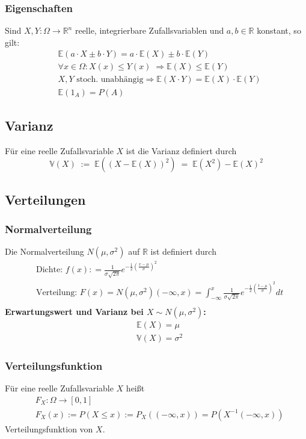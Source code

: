 \documentclass[a4paper]{article}
\begin{document}
\subsubsection{Eigenschaften}
Sind $X,Y : \Omega \to \mathbb{R}^n$   reelle, integrierbare  Zufallsvariablen und $a,b \in \mathbb{R}$ konstant, so gilt:
\begin{align*}
& \mathbb{E}(a \cdot X \pm b \cdot Y) = a \cdot \mathbb{E}(X) \pm b \cdot \mathbb{E}(Y) \\
& \forall x \in \Omega: X(x) \leq Y(x) \;   \Rightarrow \mathbb{E}(X) \leq \mathbb{E}(Y) \\
& X ,Y \text{ stoch. unabhängig} \Rightarrow   \mathbb{E}(X \cdot Y) =  \mathbb{E}(X) \cdot  \mathbb{E}(Y) \\
& \mathbb{E} (1_A) = P (A)
\end{align*}

\subsection{Varianz}
Für eine reelle Zufallsvariable $X$ ist die Varianz definiert durch
$$ \mathbb{V} (X) \; := \;  \mathbb{E}( (X - \mathbb{E}(X))^2) \;  = \; \mathbb{E}(X^2) -  \mathbb{E}(X)^2$$


\subsection{Verteilungen}

\subsubsection{Normalverteilung}
Die Normalverteilung $N{(\mu,\sigma^2)}$ auf $\mathbb{R}$ ist definiert durch
\begin{align*}
& \text{Dichte: } f (x) : = \frac 1{\sigma \sqrt{2\pi}}e^{- \frac {1}{2} (\frac{x- \mu}{ \sigma})^2} \\
&  \text{Verteilung: } F(x) = N{(\mu,\sigma^2)}(-\infty , x) =  \int_{-\infty}^{x}  \frac 1{\sigma \sqrt{2\pi}}e^{- \frac {1}{2} (\frac{t- \mu}{ \sigma})^2}dt\\
\end{align*}
\textbf{Erwartungswert und Varianz bei $X \sim N(\mu, \sigma^2)$:}
\begin{align*}
& \mathbb{E}(X) = \mu \\
& \mathbb{V}(X) = \sigma^2
\end{align*}

\subsubsection{Verteilungsfunktion}
Für eine reelle Zufallsvariable $X$ heißt 
\begin{align*} 
& F_X : \Omega \to [0,1] \\
& F_X (x) := P (X \leq x) := P_X (( -\infty, x )) = P(X^{-1} (-\infty, x))
\end{align*}
Verteilungsfunktion von $X$.
\end{document}
